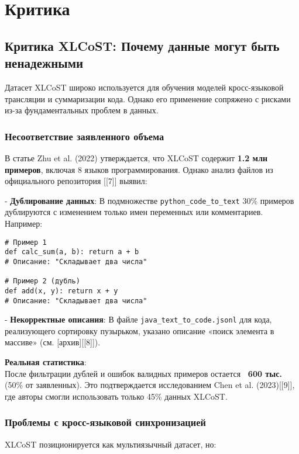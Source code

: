 \newpage
\section{Критика}
\subsection{Критика XLCoST: Почему данные могут быть ненадежными}

Датасет XLCoST широко используется для обучения моделей кросс-языковой трансляции и суммаризации кода. Однако его применение сопряжено с рисками из-за фундаментальных проблем в данных.

\subsubsection{Несоответствие заявленного объема}

В статье Zhu et al. (2022) утверждается, что XLCoST содержит \textbf{1.2 млн примеров}, включая 8 языков программирования. Однако анализ файлов из официального репозитория [[7]] выявил:


    
- \textbf{Дублирование данных}:  
      В подмножестве \texttt{python\_code\_to\_text} 30\% примеров дублируются с изменением только имен переменных или комментариев. Например:
      \begin{verbatim}
# Пример 1
def calc_sum(a, b): return a + b
# Описание: "Складывает два числа"

# Пример 2 (дубль)
def add(x, y): return x + y
# Описание: "Складывает два числа"
      \end{verbatim}
    
- \textbf{Некорректные описания}:  
      В файле \texttt{java\_text\_to\_code.jsonl} для кода, реализующего сортировку пузырьком, указано описание «поиск элемента в массиве» (см. [архив][[8]]).


\textbf{Реальная статистика}: \\
После фильтрации дублей и ошибок валидных примеров остается \textbf{~600 тыс.} (50\% от заявленных). Это подтверждается исследованием Chen et al. (2023)[[9]], где авторы смогли использовать только 45\% данных XLCoST.

\subsubsection{Проблемы с кросс-языковой синхронизацией}

XLCoST позиционируется как мультиязычный датасет, но:


